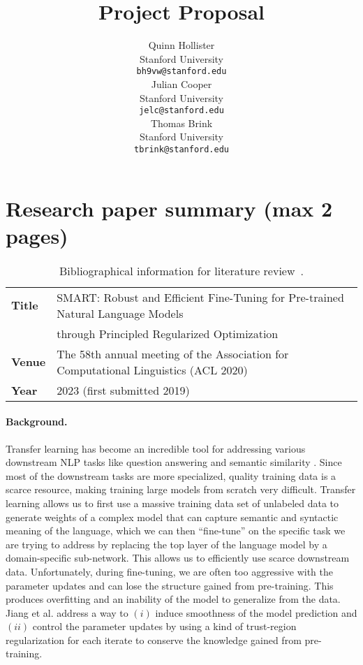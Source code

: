 \documentclass{article}
\title{
  Project Proposal \\
  \vspace{1em}
}
\author{
  Quinn Hollister \\
  Stanford University \\
  \texttt{bh9vw@stanford.edu} \\
   \And
    Julian Cooper \\
  Stanford University \\
  \texttt{jelc@stanford.edu} \\
   \And
   Thomas Brink \\
  Stanford University \\
  \texttt{tbrink@stanford.edu} \\
}
\newcommand{\note}[1]{\textcolor{blue}{{#1}}}
\begin{document}
\maketitle


\vspace{-0.7cm}
\section{Research paper summary (max 2 pages)}
\begin{table}[h]
\footnotesize
    \centering
    \begin{tabular}{ll}
        \toprule
        \textbf{Title} & SMART: Robust and Efficient Fine-Tuning for Pre-trained
Natural Language Models \\
& through Principled Regularized
Optimization\\
        \midrule
        \textbf{Venue} & 	The 58th annual meeting of the Association for Computational Linguistics (ACL 2020) \\
        \textbf{Year}  & 2023 (first submitted 2019) \\
        \bottomrule
    \end{tabular}
    \vspace{1em}
    \caption{Bibliographical information for literature review~\cite{smart}.}
\end{table} 
\vspace{-0.35cm}

\paragraph{Background.}
Transfer learning has become an incredible tool for addressing various downstream NLP tasks like question answering and semantic similarity \cite{weiss2016survey}. Since most of the downstream tasks are more specialized, quality training data is a scarce resource, making training large models from scratch very difficult. Transfer learning allows us to first use a massive training data set of unlabeled data to generate weights of a complex model that can capture semantic and syntactic meaning of the language, which we can then “fine-tune” on the specific task we are trying to address by replacing the top layer of the language model by a domain-specific sub-network. This allows us to efficiently use scarce downstream data. Unfortunately, during fine-tuning, we are often too aggressive with the parameter updates and can lose the structure gained from pre-training. This produces overfitting and an inability of the model to generalize from the data. Jiang et al. \cite{smart} address a way to $(i)$ induce smoothness of the model prediction and $(ii)$ control the parameter updates by using a kind of trust-region regularization for each iterate to conserve the knowledge gained from pre-training.
\end{document}
